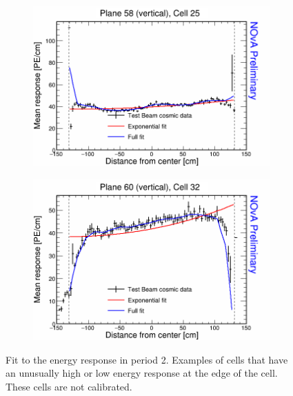 \begin{figure}[h]
\begin{subfigure}{0.495\textwidth}
  \end{subfigure}
  \begin{subfigure}{0.495\textwidth}
    \includegraphics[width=\linewidth]{Plots/RelativeCalibrationResults/p2_058_025.png}
  \end{subfigure}
  \begin{subfigure}{0.495\textwidth}
    \includegraphics[width=\linewidth]{Plots/RelativeCalibrationResults/p2_060_032.png}
  \end{subfigure}
  \caption[Attenuation fits for cells with large fluctuations in period 2 data]{Fit to the energy response in period 2. Examples of cells that have an unusually high or low energy response at the edge of the cell. These cells are not calibrated.}
  \label{fig:AttenfitResultsPerio2_CellEdge}
\end{figure}

\FloatBarrier
